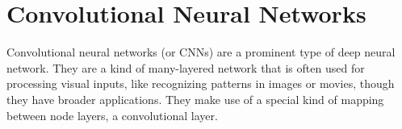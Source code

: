 \chapter{Convolutional Neural Networks}\label{ch_cnn}







Convolutional neural networks (or CNNs) are a prominent type of deep neural network. They are a kind of many-layered network that is often used for processing visual inputs, like recognizing patterns in images or movies, though they have broader applications. They make use of a special kind of mapping between node layers, a convolutional layer.

